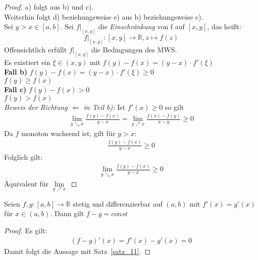 \begin{proof}
	a) folgt aus b) und c). \\
	Weiterhin folgt d) beziehungsweise e) aus b) beziehungsweise c). \\
	Sei $ y > x \in [a,b]$. Sei $f|_{[x,y]}$ die \textit{Einschränkung} 
	von f auf $[x,y]$, das heißt: 
	\begin{equation*}
		f|_{[x,y]} : [x,y] \rightarrow \mathbb{R}, z \mapsto f(z)
	\end{equation*}
	Offensichtlich erfüllt $f|_{[x,y]}$ die Bedingungen des MWS. \\
	Es existiert 
	ein $\xi \in (x,y)$ mit $f(y)-f(x) = (y-x)\cdot f'(\xi)$\\
	\textbf{Fall b)} $f(y)-f(x) = (y-x)\cdot f'(\xi) \geq 0$ \\
	\hspace*{1.5cm} $f(y) \geq f(x) $ \\
	\textbf{Fall c)} $f(y)-f(x) > 0$ \\
	\hspace*{1.5cm}$f(y) > f(x)$ \\
	\emph{Beweis der Richtung $\Leftarrow$ in Teil b):} Ist $f'(x) \geq 0$ so gilt
	\begin{align*}
		\lim\limits_{y \searrow x}{\frac{f(y)-f(x)}{y-x}}
		=\lim\limits_{y \nearrow x}{\frac{f(x) -f(y)}{x-y}} \geq 0
	\end{align*}
	Da $f$ monoton wachsend ist, gilt für $y > x$: 
	\begin{align*}
		\frac{f(y)-f(x)}{y-x} \geq 0
	\end{align*}	 
	Folglich gilt: 
	\begin{align*}
		\lim\limits_{y \searrow x}{\frac{f(y)-f(x)}{y-x} } \geq 0
	\end{align*}
	Äquivalent für $\lim\limits_{y \nearrow x}{ }$ 
\end{proof}


\begin{Korollar}{
	Seien $f,g : [a,b] \rightarrow \mathbb{R}$ stetig und differenzierbar auf
	$(a,b)$ mit $f'(x) = g'(x)$ für $x \in (a,b)$. Dann gilt $f-g = const$
}\end{Korollar}

\begin{proof}
	Es gilt: 
	\begin{align*}
		(f-g)'(x) = f'(x)-g'(x) = 0
	\end{align*}
	Damit folgt die Aussage mit Satz~\ref{satz_11}.
\end{proof}

